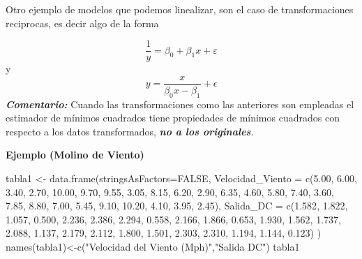 \documentclass[
]{article}
\newenvironment{Shaded}{\begin{snugshade}}{\end{snugshade}}
\newcommand{\AttributeTok}[1]{\textcolor[rgb]{0.77,0.63,0.00}{#1}}
\newcommand{\ConstantTok}[1]{\textcolor[rgb]{0.00,0.00,0.00}{#1}}
\newcommand{\FloatTok}[1]{\textcolor[rgb]{0.00,0.00,0.81}{#1}}
\newcommand{\FunctionTok}[1]{\textcolor[rgb]{0.00,0.00,0.00}{#1}}
\newcommand{\NormalTok}[1]{#1}
\newcommand{\OtherTok}[1]{\textcolor[rgb]{0.56,0.35,0.01}{#1}}
\newcommand{\StringTok}[1]{\textcolor[rgb]{0.31,0.60,0.02}{#1}}
\begin{document}
Otro ejemplo de modelos que podemos linealizar, son el caso de
transformaciones reciprocas, es decir algo de la forma

\[\dfrac{1}{y}=\beta_0+\beta_1 x+\varepsilon\] y
\[y=\dfrac{x}{\beta_0 x-\beta_1}+\epsilon\] \textbf{\emph{Comentario:}}
Cuando las transformaciones como las anteriores son empleadas el
estimador de mínimos cuadrados tiene propiedades de mínimos cuadrados
con respecto a los datos transformados, \textbf{\emph{no a los
originales}}.

\textbf{Ejemplo (Molino de Viento)}

\begin{Shaded}
\begin{Highlighting}[]
\NormalTok{tabla1 }\OtherTok{\textless{}{-}} \FunctionTok{data.frame}\NormalTok{(}\AttributeTok{stringsAsFactors=}\ConstantTok{FALSE}\NormalTok{,}
\AttributeTok{Velocidad\_Viento =} \FunctionTok{c}\NormalTok{(}\FloatTok{5.00}\NormalTok{, }\FloatTok{6.00}\NormalTok{, }\FloatTok{3.40}\NormalTok{, }\FloatTok{2.70}\NormalTok{,}
      \FloatTok{10.00}\NormalTok{, }\FloatTok{9.70}\NormalTok{, }\FloatTok{9.55}\NormalTok{, }\FloatTok{3.05}\NormalTok{, }\FloatTok{8.15}\NormalTok{, }\FloatTok{6.20}\NormalTok{, }\FloatTok{2.90}\NormalTok{, }\FloatTok{6.35}\NormalTok{, }\FloatTok{4.60}\NormalTok{, }\FloatTok{5.80}\NormalTok{, }\FloatTok{7.40}\NormalTok{, }\FloatTok{3.60}\NormalTok{,}
      \FloatTok{7.85}\NormalTok{, }\FloatTok{8.80}\NormalTok{, }\FloatTok{7.00}\NormalTok{, }\FloatTok{5.45}\NormalTok{, }\FloatTok{9.10}\NormalTok{, }\FloatTok{10.20}\NormalTok{, }\FloatTok{4.10}\NormalTok{, }\FloatTok{3.95}\NormalTok{, }\FloatTok{2.45}\NormalTok{),}
\AttributeTok{Salida\_DC =} \FunctionTok{c}\NormalTok{(}\FloatTok{1.582}\NormalTok{, }\FloatTok{1.822}\NormalTok{, }\FloatTok{1.057}\NormalTok{, }\FloatTok{0.500}\NormalTok{, }\FloatTok{2.236}\NormalTok{, }\FloatTok{2.386}\NormalTok{, }\FloatTok{2.294}\NormalTok{, }\FloatTok{0.558}\NormalTok{, }\FloatTok{2.166}\NormalTok{, }\FloatTok{1.866}\NormalTok{,}
     \FloatTok{0.653}\NormalTok{, }\FloatTok{1.930}\NormalTok{, }\FloatTok{1.562}\NormalTok{, }\FloatTok{1.737}\NormalTok{, }\FloatTok{2.088}\NormalTok{, }\FloatTok{1.137}\NormalTok{, }\FloatTok{2.179}\NormalTok{, }\FloatTok{2.112}\NormalTok{, }\FloatTok{1.800}\NormalTok{, }\FloatTok{1.501}\NormalTok{, }\FloatTok{2.303}\NormalTok{,}
     \FloatTok{2.310}\NormalTok{, }\FloatTok{1.194}\NormalTok{, }\FloatTok{1.144}\NormalTok{, }\FloatTok{0.123}\NormalTok{)}
\NormalTok{)}
\FunctionTok{names}\NormalTok{(tabla1)}\OtherTok{\textless{}{-}}\FunctionTok{c}\NormalTok{(}\StringTok{"Velocidad del Viento (Mph)"}\NormalTok{,}\StringTok{"Salida DC"}\NormalTok{)}
\NormalTok{tabla1}
\end{Highlighting}
\end{Shaded}
\end{document}
